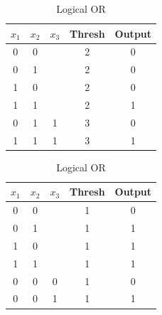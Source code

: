 \begin{table}[]
	\centering
	\caption{Truth tables of logical operations}
	\label{tab:logical-operations}
	\begin{subtable}{.5\textwidth}
		\centering
		\caption{Logical AND}
		\label{tab:logical-and}
		\begin{tabular}{ccc|c|c}
			\hline
			$x_1$ & $x_2$ & $x_3$ & Thresh & Output \\ \hline
			0           & 0           &             & 2     & 0      \\
			0           & 1           &             & 2     & 0      \\
			1           & 0           &             & 2     & 0      \\
			1           & 1           &             & 2     & 1      \\ \hline
			0           & 1           & 1           & 3     & 0      \\
			1           & 1           & 1           & 3     & 1      \\
		\end{tabular}
	\end{subtable}%
	\begin{subtable}{.5\textwidth}
		\centering
		\caption{Logical OR}
		\label{tab:logical-or}
		\begin{tabular}{ccc|c|c}
			\hline
			$x_1$ & $x_2$ & $x_3$ & Thresh & Output \\ \hline
			0           & 0           &             & 1     & 0      \\
			0           & 1           &             & 1     & 1      \\
			1           & 0           &             & 1     & 1      \\
			1           & 1           &             & 1     & 1      \\ \hline
			0           & 0           & 0           & 1     & 0      \\
			0           & 0           & 1           & 1     & 1      \\
		\end{tabular}
	\end{subtable}
	

\end{table}
